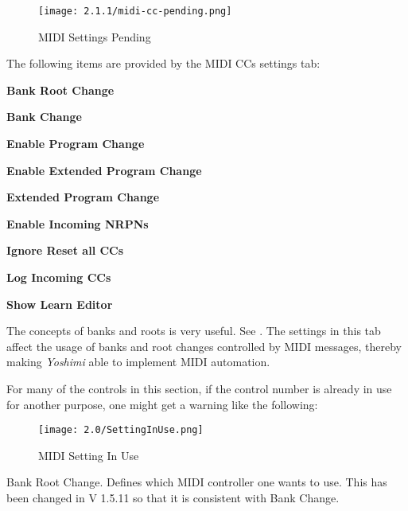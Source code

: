 \begin{figure}[H]
   \centering
   \texttt{[image: 2.1.1/midi-cc-pending.png]}
   \caption[MIDI Settings Pending]{MIDI Settings Pending}
   \label{fig:yoshimi_settings_pending}
\end{figure}

   The following items are provided by the MIDI CCs settings tab:

   \begin{enumber}
      \item \textbf{Bank Root Change}
      \item \textbf{Bank Change}
      \item \textbf{Enable Program Change}
      \item \textbf{Enable Extended Program Change}
      \item \textbf{Extended Program Change}
      \item \textbf{Enable Incoming NRPNs}
      \item \textbf{Ignore Reset all CCs}
      \item \textbf{Log Incoming CCs}
      \item \textbf{Show Learn Editor}
   \end{enumber}

   \setcounter{ItemCounter}{0}      %

   The concepts of banks and roots is very useful.
   See .
   The settings in this tab affect the usage of banks and root changes
   controlled by MIDI messages, thereby making \textsl{Yoshimi} able to
   implement MIDI automation.

   For many of the controls in this section, if the control number is
   already in use for another purpose, one might get a warning like the
   following:

\begin{figure}[H]
   \centering
   \texttt{[image: 2.0/SettingInUse.png]}
   \caption[MIDI Setting In Use]{MIDI Setting In Use}
   \label{fig:yoshimi_settings_in_use}
\end{figure}

   Bank Root Change.
   Defines which MIDI controller one wants to use. This has been changed in
   V 1.5.11 so that it is consistent with Bank Change.

